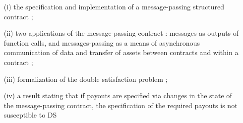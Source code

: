 \begin{itemize}
  \item[(i)] the specification and implementation of a message-passing structured
  contract ;
  \item[(ii)] two applications of the message-passing contract : messages as
  outputs of function calls, and messages-passing as a means of asynchronous
  communication of data and transfer of assets between contracts and within a contract ;
  \item[(iii)] formalization of the double satisfaction problem ;
  \item[(iv)] a result stating that if payouts are specified via changes in the
  state of the message-passing contract, the specification of the required
  payouts is not susceptible to DS
\end{itemize}




%
%
